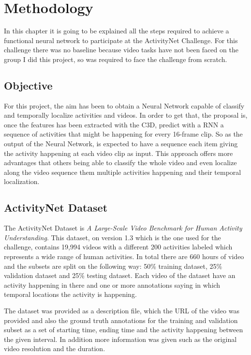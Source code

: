 \chapter{Methodology}

In this chapter it is going to be explained all the steps required to achieve a functional neural network to participate at the ActivityNet Challenge. For this challenge there was no baseline because video tasks have not been faced on the group I did this project, so was required to face the challenge from scratch.

\section{Objective}

For this project, the aim has been to obtain a Neural Network capable of classify and temporally localize activities and videos. In order to get that, the proposal is, once the features has been extracted with the C3D, predict with a RNN a sequence of activities that might be happening for every 16-frame clip. So as the output of the Neural Network, is expected to have a sequence each item giving the activity happening at each video clip as input. This approach offers more advantages that others being able to classify the whole video and even localize along the video sequence them multiple activities happening and their temporal localization.
\section{ActivityNet Dataset}

The ActivityNet Dataset\cite{caba2015activitynet} is \textit{A Large-Scale Video Benchmark for
Human Activity Understanding}. This dataset, on version 1.3 which is the one used for the challenge, contains 19,994 videos with a different 200 activities labeled which represents a wide range of human activities. In total there are 660 hours of video and the subsets are split on the following way: 50\% training dataset, 25\% validation dataset and 25\% testing dataset. Each video of the dataset have an activity happening in there and one or more annotations saying in which temporal locations the activity is happening.

The dataset was provided as a description file, which the URL of the video was provided and also the ground truth annotations for the training and validation subset as a set of starting time, ending time and the activity happening between the given interval. In addition more information was given such as the original video resolution and the duration.

